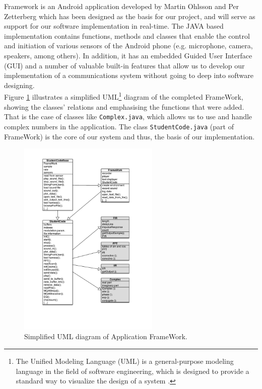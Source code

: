 \documentclass[12pt,a4paper,openright]{report}
\begin{document}
Framework is an Android application developed by Martin Ohlsson and Per Zetterberg which has been designed as the basis for our project, and will serve as support for our software implementation in real-time. The JAVA based implementation contains functions, methods and classes that enable the control and initiation of various sensors of the Android phone (e.g. microphone, camera, speakers, among others). In addition, it has an embedded  Guided User Interface (GUI) and a number of valuable built-in features that allow us to develop our implementation of a communications system without going to deep into software designing. \\

Figure \ref{fig:FrameWorkPicture} illustrates a simplified UML\footnote{The Unified Modeling Language (UML) is a general-purpose modeling language in the field of software engineering, which is designed to provide a standard way to visualize the design of a system \cite{UMLref}. } diagram of the completed FrameWork, showing the classes' relations and emphasising the functions that were added. That is the case of classes like \texttt{Complex.java}, which allows us to use and handle complex numbers in the application. The class \texttt{StudentCode.java} (part of FrameWork) is the core of our system and thus, the basis of our implementation. 




 \begin{figure}[H]
  \centering
    \includegraphics[width=0.6\textwidth]{UmlScheme.pdf}
    \caption[Simplified UML diagram of Application FrameWork]{Simplified UML diagram of Application FrameWork. }
    \label{fig:FrameWorkPicture}
\end{figure}
\end{document}
